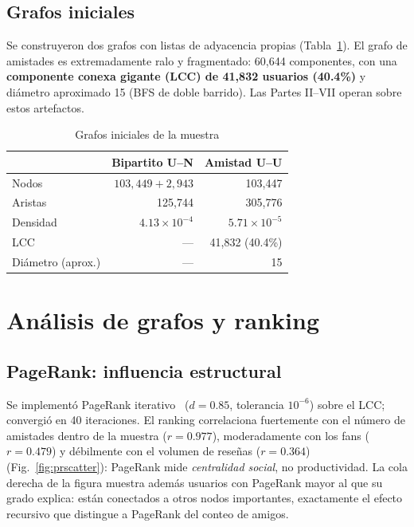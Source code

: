 \documentclass[conference]{IEEEtran}
\begin{document}
\subsection{Grafos iniciales}
Se construyeron dos grafos con listas de adyacencia propias (Tabla~\ref{tab:grafos}). El grafo de amistades es extremadamente ralo y fragmentado: 60{,}644 componentes, con una \textbf{componente conexa gigante (LCC) de 41{,}832 usuarios (40.4\%)} y diámetro aproximado 15 (BFS de doble barrido). Las Partes II--VII operan sobre estos artefactos.

\begin{table}[H]
  \caption{Grafos iniciales de la muestra}
  \centering
  \footnotesize
  \setlength{\tabcolsep}{4pt}
  \begin{tabular}{lrr}
    \toprule
     & Bipartito U--N & Amistad U--U \\
    \midrule
    Nodos    & $103{,}449 + 2{,}943$ & 103{,}447 \\
    Aristas  & 125{,}744 & 305{,}776 \\
    Densidad & $4.13\times10^{-4}$ & $5.71\times10^{-5}$ \\
    LCC      & --- & 41{,}832 (40.4\%) \\
    Diámetro (aprox.) & --- & 15 \\
    \bottomrule
  \end{tabular}
  \label{tab:grafos}
\end{table}

\section{Análisis de grafos y ranking}

\subsection{PageRank: influencia estructural}
Se implementó PageRank iterativo~\cite{pagerank} ($d=0.85$, tolerancia $10^{-6}$) sobre el LCC; convergió en 40 iteraciones. El ranking correlaciona fuertemente con el número de amistades dentro de la muestra ($r=0.977$), moderadamente con los fans ($r=0.479$) y débilmente con el volumen de reseñas ($r=0.364$) (Fig.~\ref{fig:prscatter}): PageRank mide \emph{centralidad social}, no productividad. La cola derecha de la figura muestra además usuarios con PageRank mayor al que su grado explica: están conectados a otros nodos importantes, exactamente el efecto recursivo que distingue a PageRank del conteo de amigos.
\end{document}
